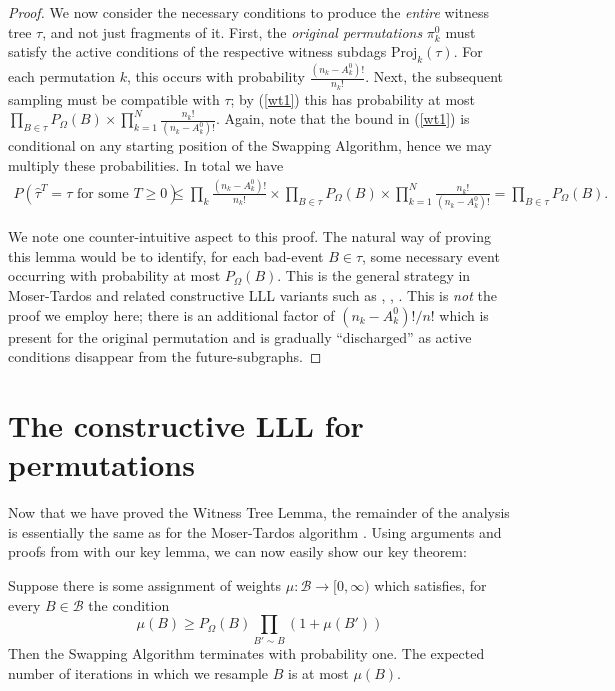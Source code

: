 \begin{proof}
We now consider the necessary conditions to produce the \emph{entire} witness tree $\tau$, and not just fragments of it. First, the \emph{original permutations} $\pi^0_k$ must satisfy the active conditions of the respective witness subdags $\text{Proj}_k(\tau)$. For each permutation $k$, this occurs with probability $\frac{(n_k - A_{k}^0)!}{n_k!}$. Next, the subsequent sampling must be compatible with $\tau$; by (\ref{wt1}) this has probability at most $\prod_{B \in \tau} P_{\Omega}(B) \times \prod_{k=1}^N \frac{n_k!}{(n_k - A_{k}^0)!}$. Again, note that the bound in (\ref{wt1}) is conditional on any starting position of the Swapping Algorithm, hence we may multiply these probabilities. In total we have
\begin{align*}
P(\text{$\hat \tau^T = \tau$ for some $T \geq 0$}) &\leq \prod_k \frac{(n_k - A_{k}^{0})!}{n_k!} \times \prod_{B \in \tau} P_{\Omega}(B) \times \prod_{k=1}^N \frac{n_k!}{(n_k - A_{k}^{0})!} = \prod_{B \in \tau} P_{\Omega}(B).
\end{align*}

We note one counter-intuitive aspect to this proof. The natural way of proving this lemma would be to identify, for each bad-event $B \in \tau$, some necessary event occurring with probability at most $P_{\Omega}(B)$. This is the general strategy in Moser-Tardos \cite{moser-tardos} and related constructive LLL variants such as \cite{harris-srin2}, \cite{achlioptas}, \cite{harvey}. This is \emph{not} the proof we employ here; there is an additional factor of $(n_k - A_{k}^{0})!/n!$ which is present for the original permutation and is gradually ``discharged'' as active conditions disappear from the future-subgraphs.
\end{proof}

\section{The constructive LLL for permutations}
\label{constructive-lll-sec}
Now that we have proved the Witness Tree Lemma, the remainder of the analysis is essentially the same as for the Moser-Tardos algorithm \cite{moser-tardos}. Using arguments and proofs from \cite{moser-tardos} with our key lemma, we can now easily show our key theorem:

\begin{theorem}
\label{thm:constr-lll}
Suppose there is some assignment of weights $\mu: \mathcal B \rightarrow [0, \infty)$ which satisfies, for every $B \in \mathcal B$ the condition
$$
\mu(B) \geq P_{\Omega}(B) \prod_{B' \sim B} (1 + \mu(B'))
$$
Then the Swapping Algorithm terminates with probability one. The expected number of iterations in which we resample $B$ is at most $\mu(B)$.
\end{theorem}

